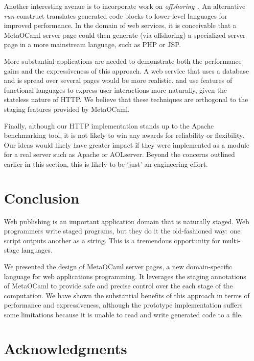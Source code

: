 \documentclass{elsart}
\def\MOC{MetaOCaml\xspace}
\begin{document}
Another interesting avenue is to incorporate work on
\emph{offshoring}~\cite{eckhardt04offshoring}.  An alternative
\emph{run} construct translates generated code blocks to lower-level
languages for improved performance.  In the domain of web services, it
is conceivable that a \MOC server page could then generate (via
offshoring) a specialized server page in a more mainstream language,
such as PHP or JSP.

More substantial applications are needed to demonstrate both the
performance gains and the expressiveness of this approach.  A web
service that uses a database and is spread over several pages would be
more realistic.  \citet{queinnec00influence} and
\citet{graunke01programming} use features of functional languages to
express user interactions more naturally, given the stateless nature
of HTTP.  We believe that these techniques are orthogonal to the
staging features provided by \MOC.

Finally, although our HTTP implementation stands up to the Apache
benchmarking tool, it is not likely to win any awards for reliability
or flexibility.  Our ideas would likely have greater impact if they
were implemented as a module for a real server such as Apache or
AOLserver.  Beyond the concerns outlined earlier in this section, this
is likely to be `just' an engineering effort.


\section{Conclusion}
\label{sec:concl}

Web publishing is an important application domain that is naturally
staged.  Web programmers write staged programs, but they do it the
old-fashioned way: one script outputs another as a string.  This is a
tremendous opportunity for multi-stage languages.

We presented the design of \MOC server pages, a new
domain-specific language for web applications programming.  It
leverages the staging annotations of \MOC to provide safe and
precise control over the each stage of the computation.
We have shown the substantial benefits of this approach in terms
of performance and expressiveness, although the prototype
implementation suffers some limitations because it is unable to
read and write generated code to a file.

\section*{Acknowledgments}
\end{document}
